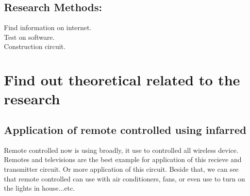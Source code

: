 \documentclass[a4paper]{report}
\begin{document}
    \section{Research Methods:}
        Find information on internet. \\
        Test on software. \\
        Construction circuit.


    \chapter{Find out theoretical related to the research}
    \thispagestyle{fancy}
    \fancyhf{}
    \section{Application of remote controlled using infarred}
        Remote controlled now is using broadly, it use to controlled all wireless device. 
        Remotes and televisions are the best example for application of this recieve and transmitter 
        circuit. Or more application of this circuit. Beside that, we can see that remote controlled 
        can use with air conditioners, fans, or even use to turn on the lights in house...etc.
\end{document}
